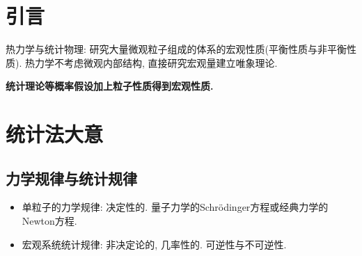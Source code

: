 
\section{引言}
热力学与统计物理: 研究大量微观粒子组成的体系的宏观性质(平衡性质与非平衡性质).
热力学不考虑微观内部结构, 直接研究宏观量建立唯象理论.

\textbf{统计理论等概率假设加上粒子性质得到宏观性质.}

\section{统计法大意}
\subsection{力学规律与统计规律}

\begin{itemize}
    \item 单粒子的力学规律: 决定性的. 量子力学的Schr\"odinger方程或经典力学的Newton方程.
    \item 宏观系统统计规律: 非决定论的, 几率性的. 可逆性与不可逆性.
\end{itemize}

